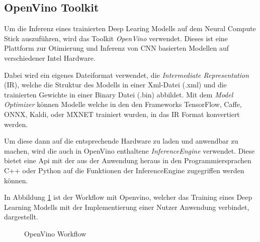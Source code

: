 \subsection{OpenVino Toolkit}

Um die Inferenz eines trainierten Deep Learing Modells auf dem
Neural Compute Stick auszuführen, wird das Toolkit 
\textit{OpenVino} verwendet.
Dieses ist eine Plattform zur Otimierung und Inferenz von 
CNN basierten Modellen auf verschiedener Intel Hardware.

Dabei wird ein eigenes Dateiformat verwendet, die \textit{Intermediate 
Representation} (IR), welche die Struktur des Modells 
in einer Xml-Datei (.xml) und die trainierten Gewichte in 
einer Binary Datei (.bin) abbildet.
Mit dem \textit{Model Optimizer} können Modelle welche in den 
den Frameworks TensorFlow, Caffe, ONNX, Kaldi, oder MXNET 
trainiert wurden, in das IR Format konvertiert werden.

Um diese dann auf die entsprechende Hardware zu laden und anwendbar 
zu machen, wird die auch in OpenVino enthaltene
\textit{InferenceEngine} verwendet.
Diese bietet eine Api mit der aus der Anwendung heraus in den 
Programmiersprachen C++ oder Python auf die Funktionen der 
InferenceEngine zugegriffen werden können.

In Abbildung \ref{fig:openvinoflow} ist der Workflow mit 
Openvino, welcher das Training eines Deep Learning Modells 
mit der Implementierung einer Nutzer Anwendung verbindet, 
dargestellt.


\vspace{1cm}
\begin{figure}[H]
    \centering
    \def\svgwidth{0.8\textwidth}
    
    \caption{OpenVino Workflow}
    \label{fig:openvinoflow}
\end{figure}
